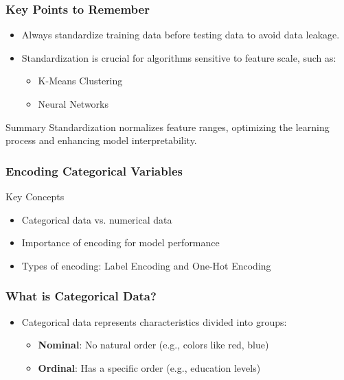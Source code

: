 \documentclass[aspectratio=169]{beamer}
\begin{document}
\begin{frame}[fragile]
    \frametitle{Key Points to Remember}
    \begin{itemize}
        \item Always standardize training data before testing data to avoid data leakage.
        \item Standardization is crucial for algorithms sensitive to feature scale, such as:
        \begin{itemize}
            \item K-Means Clustering
            \item Neural Networks
        \end{itemize}
    \end{itemize}
    
    \begin{block}{Summary}
        Standardization normalizes feature ranges, optimizing the learning process and enhancing model interpretability.
    \end{block}
\end{frame}

\begin{frame}
    \frametitle{Encoding Categorical Variables}
    \begin{block}{Key Concepts}
        \begin{itemize}
            \item Categorical data vs. numerical data
            \item Importance of encoding for model performance
            \item Types of encoding: Label Encoding and One-Hot Encoding
        \end{itemize}
    \end{block}
\end{frame}

\begin{frame}
    \frametitle{What is Categorical Data?}
    \begin{itemize}
        \item Categorical data represents characteristics divided into groups:
        \begin{itemize}
            \item \textbf{Nominal}: No natural order (e.g., colors like red, blue)
            \item \textbf{Ordinal}: Has a specific order (e.g., education levels)
        \end{itemize}
    \end{itemize}
\end{frame}
\end{document}

